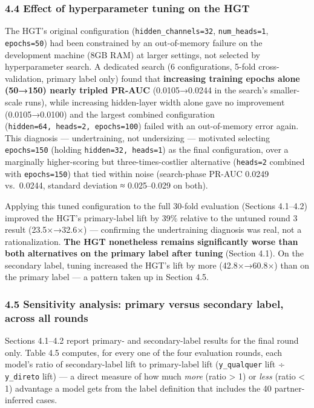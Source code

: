 \documentclass[11pt,]{article}
\begin{document}
\hypertarget{effect-of-hyperparameter-tuning-on-the-hgt}{%
\subsubsection{4.4 Effect of hyperparameter tuning on the
HGT}\label{effect-of-hyperparameter-tuning-on-the-hgt}}

The HGT's original configuration (\texttt{hidden\_channels=32},
\texttt{num\_heads=1}, \texttt{epochs=50}) had been constrained by an
out-of-memory failure on the development machine (8GB RAM) at larger
settings, not selected by hyperparameter search. A dedicated search (6
configurations, 5-fold cross-validation, primary label only) found that
\textbf{increasing training epochs alone (50→150) nearly tripled PR-AUC}
(0.0105→0.0244 in the search's smaller-scale runs), while increasing
hidden-layer width alone gave no improvement (0.0105→0.0100) and the
largest combined configuration
(\texttt{hidden=64,\ heads=2,\ epochs=100}) failed with an out-of-memory
error again. This diagnosis --- undertraining, not undersizing ---
motivated selecting \texttt{epochs=150} (holding
\texttt{hidden=32,\ heads=1}) as the final configuration, over a
marginally higher-scoring but three-times-costlier alternative
(\texttt{heads=2} combined with \texttt{epochs=150}) that tied within
noise (search-phase PR-AUC 0.0249 vs.~0.0244, standard deviation ≈
0.025--0.029 on both).

Applying this tuned configuration to the full 30-fold evaluation
(Sections 4.1--4.2) improved the HGT's primary-label lift by 39\%
relative to the untuned round 3 result (23.5×→32.6×) --- confirming the
undertraining diagnosis was real, not a rationalization. \textbf{The HGT
nonetheless remains significantly worse than both alternatives on the
primary label after tuning} (Section 4.1). On the secondary label,
tuning increased the HGT's lift by more (42.8×→60.8×) than on the
primary label --- a pattern taken up in Section 4.5.

\hypertarget{sensitivity-analysis-primary-versus-secondary-label-across-all-rounds}{%
\subsubsection{4.5 Sensitivity analysis: primary versus secondary label,
across all
rounds}\label{sensitivity-analysis-primary-versus-secondary-label-across-all-rounds}}

Sections 4.1--4.2 report primary- and secondary-label results for the
final round only. Table 4.5 computes, for every one of the four
evaluation rounds, each model's ratio of secondary-label lift to
primary-label lift (\texttt{y\_qualquer} lift ÷ \texttt{y\_direto} lift)
--- a direct measure of how much \emph{more} (ratio \textgreater{} 1) or
\emph{less} (ratio \textless{} 1) advantage a model gets from the label
definition that includes the 40 partner-inferred cases.
\end{document}

